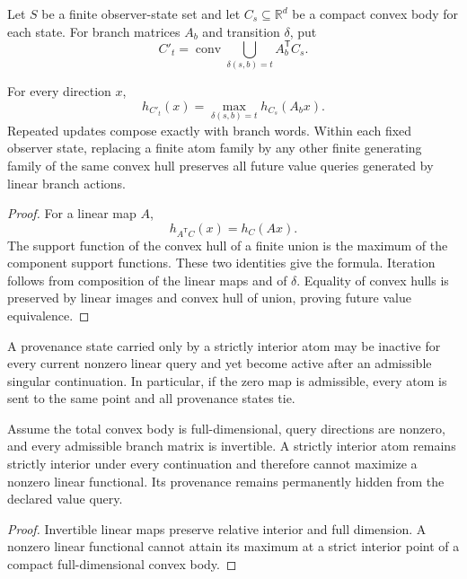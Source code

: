 Let \(S\) be a finite observer-state set and let \(C_s\subseteq\mathbb R^d\) be a compact convex body for each state.  For branch matrices \(A_b\) and transition \(\delta\), put
\[
 C'_t
 =
 \operatorname{conv}
 \bigcup_{\delta(s,b)=t}A_b^{\mathsf T}C_s.
\]

\begin{theorem}
\label{thm:block18-convex-packet-transport}
For every direction \(x\),
\[
 h_{C'_t}(x)
 =
 \max_{\delta(s,b)=t}h_{C_s}(A_bx).
\]
Repeated updates compose exactly with branch words.  Within each fixed observer state, replacing a finite atom family by any other finite generating family of the same convex hull preserves all future value queries generated by linear branch actions.
\end{theorem}

\begin{proof}
For a linear map \(A\),
\[
 h_{A^{\mathsf T}C}(x)=h_C(Ax).
\]
The support function of the convex hull of a finite union is the maximum of the component support functions.  These two identities give the formula.  Iteration follows from composition of the linear maps and of \(\delta\).  Equality of convex hulls is preserved by linear images and convex hull of union, proving future value equivalence.
\end{proof}

\begin{proposition}
\label{prop:block18-singular-resurrection}
A provenance state carried only by a strictly interior atom may be inactive for every current nonzero linear query and yet become active after an admissible singular continuation.  In particular, if the zero map is admissible, every atom is sent to the same point and all provenance states tie.
\end{proposition}

\begin{proposition}
\label{prop:block18-invertible-hiding}
Assume the total convex body is full-dimensional, query directions are nonzero, and every admissible branch matrix is invertible.  A strictly interior atom remains strictly interior under every continuation and therefore cannot maximize a nonzero linear functional.  Its provenance remains permanently hidden from the declared value query.
\end{proposition}

\begin{proof}
Invertible linear maps preserve relative interior and full dimension.  A nonzero linear functional cannot attain its maximum at a strict interior point of a compact full-dimensional convex body.
\end{proof}

